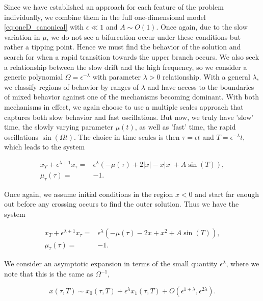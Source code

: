 Since we have established an approach for each feature of the problem individually, we combine them in the full one-dimensional model \eqref{eq:oneD_canonical} with $\epsilon\ll 1$ and ${A\sim O(1)}$. Once again, due to the slow variation in $\mu$, we do not see a bifurcation occur under these conditions but rather a tipping point. Hence we must find the behavior of the solution and search for when a rapid transition towards the upper branch occurs. We also seek a relationship between the slow drift and the high frequency, so we consider a generic polynomial $\Omega = \epsilon^{-\lambda}$ with parameter $\lambda>0$ relationship. With a general $\lambda$, we classify regions of behavior by ranges of $\lambda$ and have access to the boundaries of mixed behavior against one of the mechanisms becoming dominant. With both mechanisms in effect, we again choose to use a multiple scales approach that captures both slow behavior and fast oscillations. But now, we truly have 'slow' time, the slowly varying parameter $\mu(t)$, as well as 'fast' time, the rapid oscillations $\sin(\Omega t)$. The choice in time scales is then $\tau=\epsilon t$ and $T=\epsilon^{-\lambda} t$, which leads to the system

\begin{equation*}
\begin{aligned}
x_T+\epsilon^{\lambda+1}x_\tau =& \epsilon^\lambda (-\mu(\tau)+2|x|-x|x|+A\sin(T)),\\
\mu_\tau(\tau)=&-1.
\end{aligned}
\end{equation*}

Once again, we assume initial conditions in the region $x<0$ and start far enough out before any crossing occurs to find the outer solution. Thus we have the system

\begin{equation}\label{eq:oneD_slowosc_outereq}
\begin{aligned}
x_T+\epsilon^{\lambda+1}x_\tau =& \epsilon^\lambda (-\mu(\tau)-2x+x^2+A\sin(T)),\\
\mu_\tau(\tau)=&-1.
\end{aligned}
\end{equation}

We consider an asymptotic expansion in terms of the small quantity $\epsilon^\lambda$, where we note that this is the same as $\Omega^{-1}$,

\begin{equation}\label{eq:oneD_slowosc_asympexpansion}
x(\tau,T)\sim x_0(\tau,T)+\epsilon^\lambda x_1(\tau,T)+O(\epsilon^{1+\lambda},\epsilon^{2\lambda}).
\end{equation}

